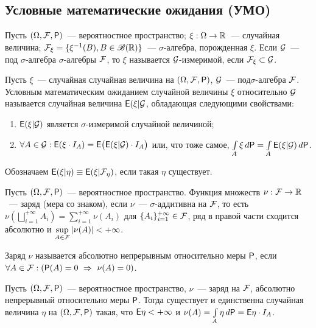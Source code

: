 \subsection*{Условные математические ожидания (УМО)}
Пусть $(\Omega, \F, \P)$~--- вероятностное пространство; $\xi: \Omega \rightarrow \R$~--- случайная величина; $\F_\xi = \{ \xi^{-1}(B), B \in \B(\R) \}$~--- $\sigma$-алгебра, порожденная $\xi$. Если $\G$~--- под $\sigma$-алгебра $\sigma$-алгебры $\F$, то  $\xi$ называется $\G$-измеримой, если $\F_\xi \subset \G$.
\begin{definition}
	Пусть $\xi$~--- случайная случайная величина на $(\Omega, \F, \P)$, $\G$~--- под$\sigma$-алгебра $\F$. Условным математическим ожиданием случайной величины $\xi$ относительно $\G$ называется случайная величина $\E (\xi | \G$, обладающая следующими свойствами:
	\begin{enumerate}
		\item $\E(\xi | \G )$ является $\sigma$-измеримой случайной величиной;
		\item $\forall A \in \G: \E ( \xi \cdot I_A) = \E \big( \E (\xi | \G )\cdot I_A \big)$ или, что тоже самое, $\int\limits_A \xi \, d \P = \int\limits_A \E (\xi | \G )\,d \P$.
	\end{enumerate}
	Обозначаем $\E (\xi | \eta ) \equiv \E (\xi | \F_\eta )$, если такая $\eta$ существует.
\end{definition}
\begin{definition}
	Пусть $(\Omega, \F, \P)$~--- вероятностное пространство. Функция множеств $\nu: \F \rightarrow \R$~--- заряд (мера со знаком), если $\nu$~--- $\sigma$-аддитивна на $\F$, то есть $\nu \left( \bigsqcup\limits_{i=1}^{+\infty} A_i \right) = \sum\limits_{i=1}^{+\infty} \nu (A_i)$ для $\{ A_i \}_{i=1}^{+\infty} \in \F$, ряд в правой части сходится абсолютно и  $\sup\limits_{A \in \F} | \nu(A) | < + \infty$.
\end{definition}
\begin{definition}
	Заряд $\nu$ называется абсолютно непрерывным относительно меры $\P$, если $\forall A \in \F: (\P (A) = 0~\Rightarrow~\nu (A) = 0)$.
\end{definition}
\begin{theorem}
	Пусть $(\Omega, \F, \P)$~--- вероятностное пространство, $\nu$~--- заряд на $\F$, абсолютно непрерывный относительно меры $\P$. Тогда существует и единственна случайная величина $\eta$ на $(\Omega, \F, \P)$ такая, что $\E \eta < +\infty$ и $\nu(A) = \int\limits_A \eta \, d \P = \E \eta \cdot I_A$.
\end{theorem}